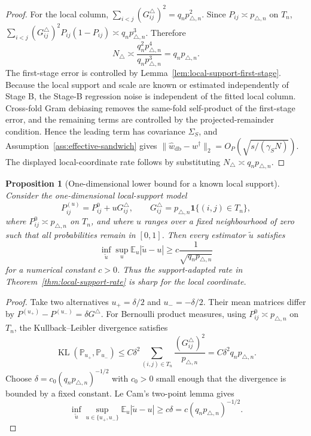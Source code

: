 \documentclass[12pt]{article}
\newtheorem{proposition}{Proposition}
\newcommand{\1}{\mathbf{1}}
\begin{document}
\begin{proof}
For the local column, \(\sum_{i<j}(G^\triangle_{ij})^2=q_np_{\triangle,n}^2\).
Since \(P_{ij}\asymp p_{\triangle,n}\) on \(T_n\),
\(\sum_{i<j}(G^\triangle_{ij})^2P_{ij}(1-P_{ij})\asymp q_np_{\triangle,n}^3\).
Therefore
\[
    N_\triangle
    \asymp
    \frac{q_n^2p_{\triangle,n}^4}{q_np_{\triangle,n}^3}
    =
    q_np_{\triangle,n}.
\]
The first-stage error is controlled by
Lemma~\ref{lem:local-support-first-stage}. Because the local support and
scale are known or estimated independently of Stage B, the Stage-B regression
noise is independent of the fitted local column. Cross-fold Gram debiasing
removes the same-fold self-product of the first-stage error, and the remaining
terms are controlled by the projected-remainder condition. Hence the leading
term has covariance \(\Sigma_S\), and Assumption~\ref{ass:effective-sandwich}
gives \(\|\widehat w_{\mathrm{db}}-w^\dagger\|_2=O_P(\sqrt{s/(\gamma_SN)})\).
The displayed local-coordinate rate follows by substituting
\(N_\triangle\asymp q_np_{\triangle,n}\).
\end{proof}

\begin{proposition}[One-dimensional lower bound for a known local support]
\label{prop:local-lower-bound}
Consider the one-dimensional local-support model
\[
    P^{(u)}_{ij}
    =
    P^0_{ij}+uG^\triangle_{ij},
    \qquad
    G^\triangle_{ij}=p_{\triangle,n}\mathbf 1\{(i,j)\in T_n\},
\]
where \(P^0_{ij}\asymp p_{\triangle,n}\) on \(T_n\), and where \(u\) ranges
over a fixed neighbourhood of zero such that all probabilities remain in
\([0,1]\). Then every estimator \(\widetilde u\) satisfies
\[
    \inf_{\widetilde u}\sup_{u}
    \mathbb E_u|\widetilde u-u|
    \ge
    c\frac{1}{\sqrt{q_np_{\triangle,n}}}
\]
for a numerical constant \(c>0\). Thus the support-adapted rate in
Theorem~\ref{thm:local-support-rate} is sharp for the local coordinate.
\end{proposition}

\begin{proof}
Take two alternatives \(u_+=\delta/2\) and \(u_-=-\delta/2\). Their mean
matrices differ by \(P^{(u_+)}-P^{(u_-)}=\delta G^\triangle\). For Bernoulli
product measures, using \(P^0_{ij}\asymp p_{\triangle,n}\) on \(T_n\), the
Kullback--Leibler divergence satisfies
\[
    \operatorname{KL}\!\left(
        \mathbb P_{u_+},\mathbb P_{u_-}
    \right)
    \le
    C\delta^2
    \sum_{(i,j)\in T_n}
    \frac{(G^\triangle_{ij})^2}{p_{\triangle,n}}
    =
    C\delta^2
    q_np_{\triangle,n}.
\]
Choose \(\delta=c_0(q_np_{\triangle,n})^{-1/2}\) with \(c_0>0\) small enough
that the divergence is bounded by a fixed constant. Le Cam's two-point lemma
gives
\[
    \inf_{\widetilde u}\sup_{u\in\{u_+,u_-\}}
    \mathbb E_u|\widetilde u-u|
    \ge
    c\delta
    =
    c(q_np_{\triangle,n})^{-1/2}.
\]
\end{proof}
\end{document}
